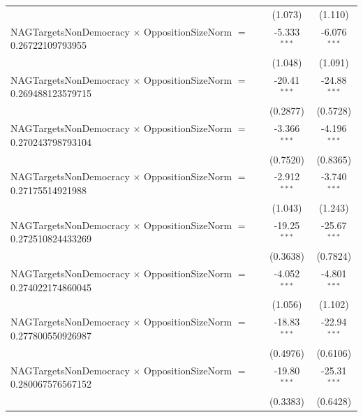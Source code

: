 \begin{tabular}{lcc}
                                                                                & (1.073)              & (1.110)\\   
   NAGTargetsNonDemocracy $\times$ OppositionSizeNorm $=$ 0.26722109793955      & -5.333$^{***}$       & -6.076$^{***}$\\   
                                                                                & (1.048)              & (1.091)\\   
   NAGTargetsNonDemocracy $\times$ OppositionSizeNorm $=$ 0.269488123579715     & -20.41$^{***}$       & -24.88$^{***}$\\   
                                                                                & (0.2877)             & (0.5728)\\   
   NAGTargetsNonDemocracy $\times$ OppositionSizeNorm $=$ 0.270243798793104     & -3.366$^{***}$       & -4.196$^{***}$\\   
                                                                                & (0.7520)             & (0.8365)\\   
   NAGTargetsNonDemocracy $\times$ OppositionSizeNorm $=$ 0.27175514921988      & -2.912$^{***}$       & -3.740$^{***}$\\   
                                                                                & (1.043)              & (1.243)\\   
   NAGTargetsNonDemocracy $\times$ OppositionSizeNorm $=$ 0.272510824433269     & -19.25$^{***}$       & -25.67$^{***}$\\   
                                                                                & (0.3638)             & (0.7824)\\   
   NAGTargetsNonDemocracy $\times$ OppositionSizeNorm $=$ 0.274022174860045     & -4.052$^{***}$       & -4.801$^{***}$\\   
                                                                                & (1.056)              & (1.102)\\   
   NAGTargetsNonDemocracy $\times$ OppositionSizeNorm $=$ 0.277800550926987     & -18.83$^{***}$       & -22.94$^{***}$\\   
                                                                                & (0.4976)             & (0.6106)\\   
   NAGTargetsNonDemocracy $\times$ OppositionSizeNorm $=$ 0.280067576567152     & -19.80$^{***}$       & -25.31$^{***}$\\   
                                                                                & (0.3383)             & (0.6428)\\   

\end{tabular}
